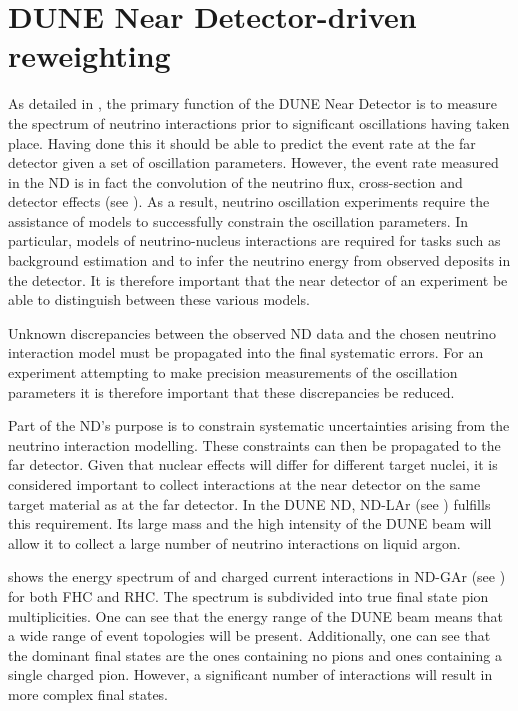 \chapter{DUNE Near Detector-driven reweighting}
\label{sec:dune_ndrwt}

As detailed in , the primary function of the DUNE Near Detector is to measure the spectrum of neutrino interactions prior to significant oscillations having taken place.
Having done this it should be able to predict the event rate at the far detector given a set of oscillation parameters.
However, the event rate measured in the ND is in fact the convolution of the neutrino flux, cross-section and detector effects (see ).
As a result, neutrino oscillation experiments require the assistance of models to successfully constrain the oscillation parameters.
In particular, models of neutrino-nucleus interactions are required for tasks such as background estimation and to infer the neutrino energy from observed deposits in the detector.
It is therefore important that the near detector of an experiment be able to distinguish between these various models.

Unknown discrepancies between the observed ND data and the chosen neutrino interaction model must be propagated into the final systematic errors.
For an experiment attempting to make precision measurements of the oscillation parameters it is therefore important that these discrepancies be reduced.

Part of the ND's purpose is to constrain systematic uncertainties arising from the neutrino interaction modelling.
These constraints can then be propagated to the far detector.
Given that nuclear effects will differ for different target nuclei, it is considered important to collect interactions at the near detector on the same target material as at the far detector.
In the DUNE ND, ND-LAr (see ) fulfills this requirement.
Its large mass and the high intensity of the DUNE beam will allow it to collect a large number of neutrino interactions on liquid argon.


 shows the energy spectrum of \numu and \anumu charged current interactions in ND-GAr (see ) for both FHC and RHC.
The spectrum is subdivided into true final state pion multiplicities. 
One can see that the energy range of the DUNE beam means that a wide range of event topologies will be present.
Additionally, one can see that the dominant final states are the ones containing no pions and ones containing a single charged pion.
However, a significant number of interactions will result in more complex final states.

